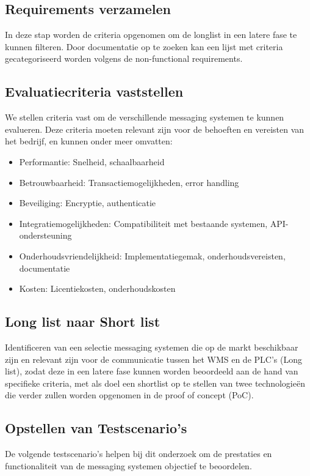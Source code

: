  
\subsection{Requirements verzamelen}
In deze stap worden de criteria opgenomen om de longlist in een latere fase te kunnen filteren.
Door documentatie op te zoeken kan een lijst met criteria gecategoriseerd worden volgens de non-functional requirements.

\subsection{Evaluatiecriteria vaststellen}
We stellen criteria vast om de verschillende messaging systemen te kunnen evalueren. 
Deze criteria moeten relevant zijn voor de behoeften en vereisten van het bedrijf, en kunnen onder meer omvatten:
\begin{itemize}
  \item Performantie: Snelheid, schaalbaarheid
  \item Betrouwbaarheid: Transactiemogelijkheden, error handling
  \item Beveiliging: Encryptie, authenticatie
  \item Integratiemogelijkheden: Compatibiliteit \newline met bestaande systemen, API-ondersteuning
  \item Onderhoudsvriendelijkheid: Implementatiegemak, onderhoudsvereisten, documentatie
  \item Kosten: Licentiekosten, onderhoudskosten
\end{itemize}

\subsection{Long list naar Short list}
Identificeren van een selectie messaging systemen die op de markt beschikbaar zijn en relevant zijn voor de communicatie tussen 
het WMS en de PLC's (Long list), zodat deze in een latere fase kunnen worden beoordeeld aan de hand van specifieke criteria, 
met als doel een shortlist op te stellen van twee technologieën die verder zullen worden opgenomen in de proof of concept (PoC).

\subsection{Opstellen van Testscenario's}
De volgende testscenario's helpen bij dit onderzoek om de prestaties en functionaliteit van de messaging systemen 
objectief te beoordelen.

